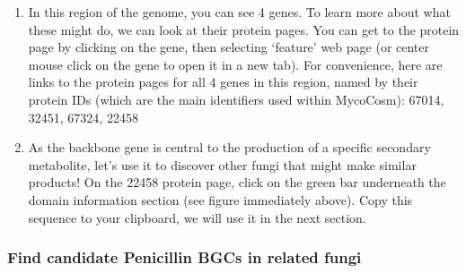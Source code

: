 \documentclass[
  letterpaper,
  DIV=11,
  numbers=noendperiod]{scrreprt}
\begin{document}
\begin{enumerate}
  the `+' next to the track and look at a few of these genes.
\item
  In this region of the genome, you can see 4 genes. To learn more about
  what these might do, we can look at their protein pages. You can get
  to the protein page by clicking on the gene, then selecting `feature'
  web page (or center mouse click on the gene to open it in a new tab).
  For convenience, here are links to the protein pages for all 4 genes
  in this region, named by their protein IDs (which are the main
  identifiers used within MycoCosm): 67014, 32451, 67324, 22458
\item
  As the backbone gene is central to the production of a specific
  secondary metabolite, let's use it to discover other fungi that might
  make similar products! On the 22458 protein page, click on the green
  bar underneath the domain information section (see figure immediately
  above). Copy this sequence to your clipboard, we will use it in the
  next section.
\end{enumerate}

\subsubsection*{Find candidate Penicillin BGCs in related
fungi}\label{find-candidate-penicillin-bgcs-in-related-fungi}
\end{document}
